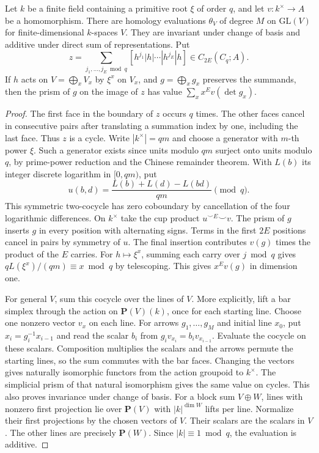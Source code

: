 \begin{lemma}\label{addc:residue}
Let \(k\) be a finite field containing a primitive root
\(\xi\) of order \(q\), and let \(v:k^\times\to A\) be a
homomorphism. There are homology evaluations \(\theta_V\) of degree
\(M\) on \(\mathrm{GL}(V)\) for finite-dimensional \(k\)-spaces \(V\).
They are invariant under change of basis and additive under direct
sum of representations. Put
\[
 z=\sum_{j_1,\dots,j_E\bmod q}
       [h^{j_1}|h|\cdots|h^{j_E}|h]\in C_{2E}(C_q;A).
\]
If \(h\) acts on \(V=\bigoplus_x V_x\) by \(\xi^x\) on \(V_x\),
and \(g=\bigoplus_x g_x\) preserves the summands, then the prism
of \(g\) on the image of \(z\) has value
\(\sum_x x^E v(\det g_x)\).
\end{lemma}
\begin{proof}
The first face in the boundary of \(z\) occurs \(q\) times. The
other faces cancel in consecutive pairs after translating a summation
index by one, including the last face. Thus \(z\) is a cycle.
Write \(|k^\times|=q m\) and choose a generator with \(m\)-th power
\(\xi\). Such a generator exists since units modulo \(qm\) surject
onto units modulo \(q\), by prime-power reduction and the Chinese
remainder theorem. With \(L(b)\) its integer discrete logarithm in
\([0,qm)\), put
\[
   u(b,d)=\frac{L(b)+L(d)-L(bd)}{qm}\pmod q .
\]
This symmetric two-cocycle has zero coboundary by cancellation of
the four logarithmic differences. On \(k^\times\) take the cup
product \(u^{\smile E}\smile v\). The prism of \(g\) inserts \(g\)
in every position with alternating signs. Terms in the first \(2E\)
positions cancel in pairs by symmetry of \(u\). The final insertion
contributes \(v(g)\) times the product of the \(E\) carries. For
\(h\mapsto\xi^x\), summing each carry over \(j\bmod q\) gives
\(q L(\xi^x)/(qm)\equiv x\bmod q\) by telescoping. This gives
\(x^E v(g)\) in dimension one.

For general \(V\), sum this cocycle over the lines of \(V\).
More explicitly, lift a bar simplex through the action on
\(\mathbf P(V)(k)\), once for each starting line. Choose one nonzero
vector \(v_x\) on each line. For arrows \(g_1,\ldots,g_M\) and initial
line \(x_0\), put \(x_i=g_i^{-1}x_{i-1}\) and read the scalar \(b_i\)
from \(g_i v_{x_i}=b_i v_{x_{i-1}}\). Evaluate the cocycle on these
scalars. Composition multiplies the scalars and
the arrows permute the starting lines, so the sum commutes with the
bar faces. Changing the vectors gives naturally isomorphic functors
from the action groupoid to \(k^\times\). The simplicial prism of
that natural isomorphism gives the same value on cycles. This also
proves invariance under change of basis. For a block sum \(V\oplus W\),
lines with nonzero first projection lie over \(\mathbf P(V)\) with
\(|k|^{\dim W}\) lifts per line. Normalize their first projections
by the chosen vectors of \(V\). Their scalars are the scalars in \(V\).
The other lines are precisely \(\mathbf P(W)\).
Since \(|k|\equiv1\bmod q\), the evaluation is additive.


\end{proof}
